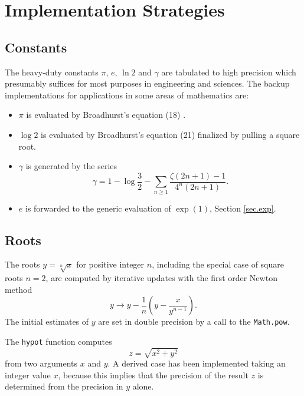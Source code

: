 \documentclass[showpacs,showkeys,amssymb,aps,twocolumn]{revtex4-1}
\begin{document}
\section{Implementation Strategies}

\subsection{Constants}

The heavy-duty constants $\pi$, $e$, $\ln 2$ and $\gamma$
are tabulated to high precision which presumably suffices
for most purposes in engineering and sciences. The backup implementations
for applications in some areas of mathematics are:
\begin{itemize} 
\item
$\pi$ is evaluated by
Broadhurst's
equation (18) \cite{BroadhurstArxiv98}.
\item
$\log 2$ is evaluated by
Broadhurst's
equation (21) \cite{BroadhurstArxiv98} finalized by pulling
a square root.
\item
$\gamma$ is generated  by the series \cite[(3.9)]{DilcherAM48}
\begin{equation}
\gamma = 1-\log\frac{3}{2}-\sum_{n\ge 1}\frac{\zeta(2n+1)-1}{4^n(2n+1)}
.
\end{equation}
\item
$e$ is forwarded to the generic evaluation of $\exp(1)$, Section \ref{sec.exp}.
\end{itemize} 

\subsection{Roots}\label{sec.root}

The roots $y=\sqrt[n]x$ for positive integer $n$, including the special case
of square roots $n=2$, are computed by iterative updates with
the first order Newton method \cite[(3.96)]{AS}
\begin{equation}
y\to y-\frac{1}{n}\left( y-\frac{x}{y^{n-1}} \right)
.
\end{equation}
The initial estimates of $y$ are
set in double precision by a call to the \texttt{Math.pow}.

The \texttt{hypot} function computes
\begin{equation}
z=\sqrt{x^2+y^2}
\end{equation}
from two arguments $x$ and $y$. A derived case has been implemented
taking an integer value $x$, because this implies that the precision of the
result $z$ is determined from the precision in $y$ alone.
\end{document}
